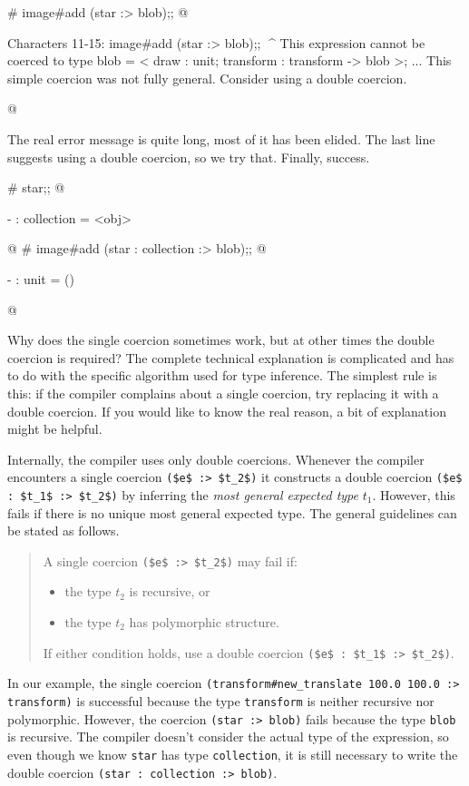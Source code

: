 \begin{ocaml}
# image#add (star :> blob);;
@
\begin{topoutput}
Characters 11-15:
  image#add (star :> blob);;
             ^^^^
This expression cannot be coerced to type
  blob = < draw : unit; transform : transform -> blob >;
...
This simple coercion was not fully general. Consider using a double coercion.
\end{topoutput}
@
\end{ocaml}
%
The real error message is quite long, most of it has been elided.  The last line suggests using a
double coercion, so we try that.  Finally, success.

\begin{ocaml}
# star;;
@
\begin{topoutput}
- : collection = <obj>
\end{topoutput}
@
# image#add (star : collection :> blob);;
@
\begin{topoutput}
- : unit = ()
\end{topoutput}
@
\end{ocaml}
%
%
Why does the single coercion sometimes work, but at other times the double coercion is required?
The complete technical explanation is complicated and has to do with the specific algorithm used for
type inference.  The simplest rule is this: if the compiler complains about a single coercion, try
replacing it with a double coercion.  If you would like to know the real reason, a bit of
explanation might be helpful.

Internally, the compiler uses only double coercions.  Whenever the compiler encounters a single
coercion \hbox{\lstinline/($e$ :> $t_2$)/} it constructs a double coercion
%
\hbox{\lstinline/($e$ : $t_1$ :> $t_2$)/} by inferring the \emph{most general expected type} $t_1$.
However, this fails if there is no unique most general expected type.  The general guidelines can be
stated as follows.
%
\begin{quote}
A single coercion \hbox{\lstinline/($e$ :> $t_2$)/} may fail if:
\begin{itemize}
\item the type $t_2$ is recursive, or
\item the type $t_2$ has polymorphic structure.
\end{itemize}
If either condition holds, use a double coercion \hbox{\lstinline/($e$ : $t_1$ :> $t_2$)/}.
\end{quote}
%
In our example, the single coercion \lstinline/(transform#new_translate 100.0 100.0 :> transform)/
is successful because the type \hbox{\lstinline/transform/} is neither recursive nor polymorphic.  However,
the coercion \hbox{\lstinline/(star :> blob)/} fails because the type \hbox{\lstinline/blob/} is recursive.  The
compiler doesn't consider the actual type of the expression, so even though we know
\hbox{\lstinline/star/} has type \hbox{\lstinline/collection/}, it is still necessary to write the double coercion
\hbox{\lstinline/(star : collection :> blob)/}.  

